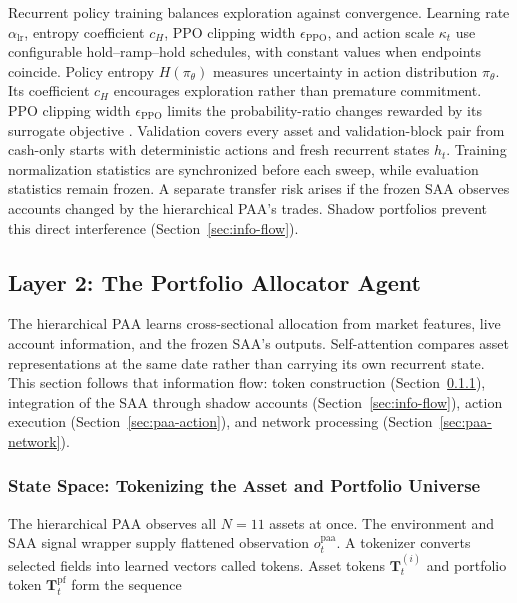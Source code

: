 Recurrent policy training balances exploration against convergence. Learning rate \(\alpha_{\mathrm{lr}}\), entropy coefficient \(c_H\), PPO clipping width \(\epsilon_{\mathrm{PPO}}\), and action scale \(\kappa_t\) use configurable hold--ramp--hold schedules, with constant values when endpoints coincide. Policy entropy \(H(\pi_\theta)\) measures uncertainty in action distribution \(\pi_\theta\). Its coefficient \(c_H\) encourages exploration rather than premature commitment. PPO clipping width \(\epsilon_{\mathrm{PPO}}\) limits the probability-ratio changes rewarded by its surrogate objective \cite{JohnSchulmanFilipWolskiPrafullaDhariwalAlecRadfordOlegKlimov.2017}. Validation covers every asset and validation-block pair from cash-only starts with deterministic actions and fresh recurrent states \(h_t\). Training normalization statistics are synchronized before each sweep, while evaluation statistics remain frozen. A separate transfer risk arises if the frozen SAA observes accounts changed by the hierarchical PAA's trades. Shadow portfolios prevent this direct interference (Section~\ref{sec:info-flow}).

\subsection{Layer 2: The Portfolio Allocator Agent}
\label{sec:paa}

The hierarchical PAA learns cross-sectional allocation from market features, live account information, and the frozen SAA's outputs. Self-attention compares asset representations at the same date rather than carrying its own recurrent state. This section follows that information flow: token construction (Section~\ref{sec:paa-state}), integration of the SAA through shadow accounts (Section~\ref{sec:info-flow}), action execution (Section~\ref{sec:paa-action}), and network processing (Section~\ref{sec:paa-network}).

\subsubsection{State Space: Tokenizing the Asset and Portfolio Universe}
\label{sec:paa-state}

The hierarchical PAA observes all \(N=11\) assets at once. The environment and SAA signal wrapper supply flattened observation \(o_t^{\mathrm{paa}}\). A tokenizer converts selected fields into learned vectors called tokens. Asset tokens \(\mathbf T_t^{(i)}\) and portfolio token \(\mathbf T_t^{\mathrm{pf}}\) form the sequence

